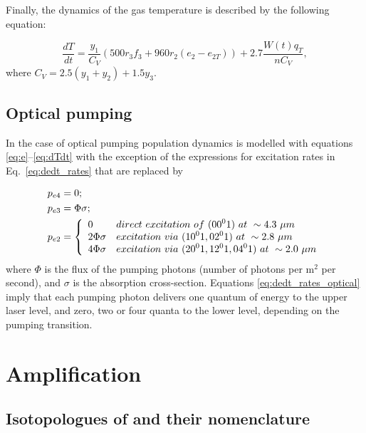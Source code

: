 \documentclass{report}
\begin{document}
Finally, the dynamics of the gas temperature is described by the following equation:

\begin{equation}\label{eq:dTdt}
\frac{dT}{dt} = \frac{y_1}{C_V}(500r_3f_3 + 960r_2(e_2-e_{2T})) + 2.7\frac{W(t)q_T}{nC_V},
\end{equation}
where $C_V = 2.5(y_1+y_2) + 1.5y_3$.


\subsection{Optical pumping}
In the case of optical pumping population dynamics is modelled with equations \ref{eq:e}--\ref{eq:dTdt} with the exception of the expressions for excitation rates in Eq.~\ref{eq:dedt_rates} that are replaced by

\begin{equation}\label{eq:dedt_rates_optical}
\begin{aligned}
&p_{e4} = 0;\\
&p_{e3} = \Phi \sigma;\\
&p_{e2} = \left\{
  \begin{array}{>{\displaystyle}l>{\displaystyle}l}
  0             & direct~excitation~of~(00^01)~at~\sim4.3~{\mu}m\\
  2 \Phi \sigma & excitation~via~(10^01, 02^01)~at~\sim2.8~{\mu}m\\
  4 \Phi \sigma & excitation~via~(20^01, 12^01, 04^01)~at~\sim2.0~{\mu}m
  \end{array}
  \right.
\end{aligned}
\end{equation}
where $\Phi$ is the flux of the pumping photons (number of photons per $\text{m}^2$ per second), and $\sigma$ is the absorption cross-section. Equations \ref{eq:dedt_rates_optical} imply that each pumping photon delivers one quantum of energy to the upper laser level, and zero, two or four quanta to the lower level, depending on the pumping transition.


\section{Amplification}


\subsection{Isotopologues of  and their nomenclature}
\end{document}
